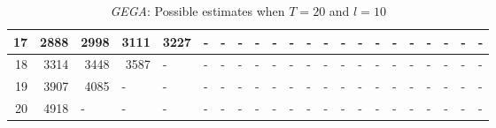 \begin{appendices}
\begin{table}[H]
\begin{minipage}[b]{18.5cm}
\begin{turn}{-90}
{\begin{tabular}{|r|r|r|r|r|r|r|r|r|r|r|r|l|l|l|l|l|l|l|l|l|l|}
17 & 2888 & 2998 & 3111 & 3227 & \multicolumn{1}{l|}{-} & \multicolumn{1}{l|}{-} & \multicolumn{1}{l|}{-} & \multicolumn{1}{l|}{-} & \multicolumn{1}{l|}{-} & \multicolumn{1}{l|}{-} & \multicolumn{1}{l|}{-} & - & - & - & - & - & - & - & - & - & - \\ \hline
18 & 3314 & 3448 & 3587 & \multicolumn{1}{l|}{-} & \multicolumn{1}{l|}{-} & \multicolumn{1}{l|}{-} & \multicolumn{1}{l|}{-} & \multicolumn{1}{l|}{-} & \multicolumn{1}{l|}{-} & \multicolumn{1}{l|}{-} & \multicolumn{1}{l|}{-} & - & - & - & - & - & - & - & - & - & - \\ \hline
19 & 3907 & 4085 & \multicolumn{1}{l|}{-} & \multicolumn{1}{l|}{-} & \multicolumn{1}{l|}{-} & \multicolumn{1}{l|}{-} & \multicolumn{1}{l|}{-} & \multicolumn{1}{l|}{-} & \multicolumn{1}{l|}{-} & \multicolumn{1}{l|}{-} & \multicolumn{1}{l|}{-} & - & - & - & - & - & - & - & - & - & - \\ \hline
20 & 4918 & \multicolumn{1}{l|}{-} & \multicolumn{1}{l|}{-} & \multicolumn{1}{l|}{-} & \multicolumn{1}{l|}{-} & \multicolumn{1}{l|}{-} & \multicolumn{1}{l|}{-} & \multicolumn{1}{l|}{-} & \multicolumn{1}{l|}{-} & \multicolumn{1}{l|}{-} & \multicolumn{1}{l|}{-} & - & - & - & - & - & - & - & - & - & - \\ \hline
\end{tabular}
}
\end{turn}
\caption{\emph{GEGA}: Possible estimates when $T=20$ and $l=10$}
 \end{minipage}
 \end{table}


\end{appendices}
